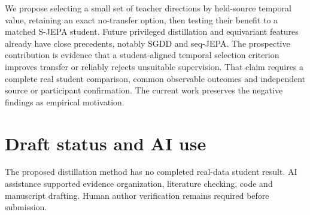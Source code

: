 \documentclass{article}
\begin{document}
We propose selecting a small set of teacher directions by held-source temporal value, retaining an exact no-transfer option, then testing their benefit to a matched S-JEPA student. Future privileged distillation and equivariant features already have close precedents, notably SGDD and seq-JEPA. The prospective contribution is evidence that a student-aligned temporal selection criterion improves transfer or reliably rejects unsuitable supervision. That claim requires a complete real student comparison, common observable outcomes and independent source or participant confirmation. The current work preserves the negative findings as empirical motivation.

\section*{Draft status and AI use}
The proposed distillation method has no completed real-data student result. AI assistance supported evidence organization, literature checking, code and manuscript drafting. Human author verification remains required before submission.
\end{document}
